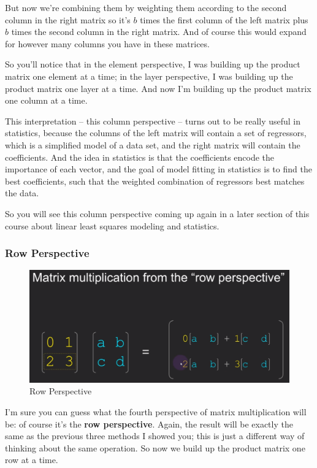 \documentclass[fleqn,10pt]{olplainarticle}
\theoremstyle{definition}
\theoremstyle{remark}
\begin{document}
But now we're combining them by weighting them according to the second column in the right matrix so it's $b$ times the first column of the left matrix plus $b$ times the second column in the right matrix. And of course this would expand for however many columns you have in these matrices.

So you'll notice that in the element perspective, I was building up the product matrix one element at a time; in the layer perspective, I was building up the product matrix one layer at a time. And now I'm building up the product matrix one column at a time.

This interpretation -- this column perspective -- turns out to be really useful in statistics, because the columns of the left matrix will contain a set of regressors, which is a simplified model of a data set, and the right matrix will contain the coefficients. And the idea in statistics is that the coefficients encode the importance of each vector, and the goal of model fitting in statistics is to find the best coefficients, such that the weighted combination of regressors best matches the data.

So you will see this column perspective coming up again in a later section of this course about linear least squares modeling and statistics.

\subsubsection*{Row Perspective}

\begin{figure}[ht]
	\centering
	\includegraphics[width=0.7\linewidth]{images/multi-05.png}
	\caption{Row Perspective}
	\label{fig:multi_05}
\end{figure}

I'm sure you can guess what the fourth perspective of matrix multiplication will be: of course it's the \textbf{row perspective}. Again, the result will be exactly the same as the previous three methods I showed you; this is just a different way of thinking about the same operation. So now we build up the product matrix one row at a time.
\end{document}
